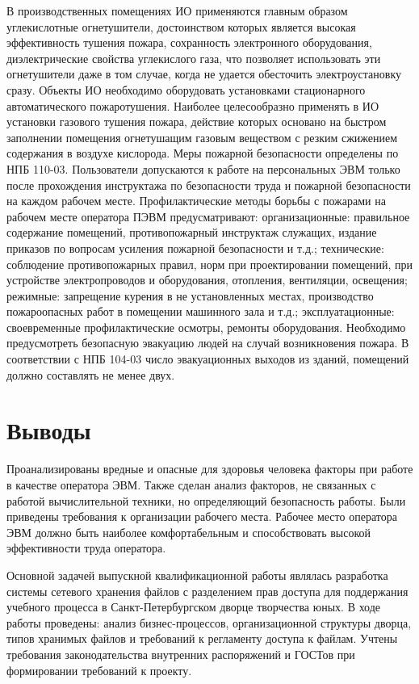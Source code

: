 \documentclass[utf8,usehyperref,12pt]{G7-32}
\begin{document}
В производственных помещениях ИО применяются главным образом углекислотные огнетушители, достоинством которых является высокая эффективность тушения пожара, сохранность электронного оборудования, диэлектрические свойства углекислого газа, что позволяет использовать эти огнетушители даже в том случае, когда не удается обесточить электроустановку сразу. 
Объекты ИО необходимо оборудовать установками стационарного автоматического пожаротушения. Наиболее целесообразно применять в ИО установки газового тушения пожара, действие которых основано на быстром заполнении помещения огнетушащим газовым веществом с резким сжижением содержания в воздухе кислорода.
Меры пожарной безопасности определены по НПБ 110-03. Пользователи допускаются к работе на персональных ЭВМ только после прохождения инструктажа по безопасности труда и пожарной безопасности на каждом рабочем месте.
Профилактические методы борьбы с пожарами на рабочем месте оператора ПЭВМ предусматривают:
организационные: правильное содержание помещений, противопожарный инструктаж служащих, издание приказов по вопросам усиления пожарной безопасности 
и т.д.;
технические: соблюдение противопожарных правил, норм при проектировании помещений, при устройстве электропроводов и оборудования, отопления, вентиляции, освещения;
режимные: запрещение курения в не установленных местах, производство пожароопасных работ в помещении машинного зала и т.д.;
эксплуатационные: своевременные профилактические осмотры, ремонты оборудования.
Необходимо предусмотреть безопасную эвакуацию людей на случай возникновения пожара. В соответствии с НПБ 104-03 число эвакуационных выходов из зданий, помещений должно составлять не менее двух.

\section{Выводы}
Проанализированы вредные и опасные для здоровья человека факторы при работе в качестве оператора ЭВМ. Также сделан анализ факторов, не связанных с работой вычислительной техники, но определяющий безопасность работы. Были приведены требования к организации рабочего места. Рабочее место оператора ЭВМ должно быть наиболее комфортабельным и способствовать высокой эффективности труда оператора.


\Conclusion

Основной задачей выпускной квалификационной работы являлась разработка системы сетевого хранения файлов с разделением прав доступа для поддержания учебного процесса в Санкт-Петербургском дворце творчества юных. В ходе работы проведены: анализ бизнес-процессов, организационной структуры дворца, типов хранимых файлов и требований к регламенту доступа к файлам. Учтены требования законодательства внутренних распоряжений и ГОСТов при формировании требований к проекту.
\end{document}
